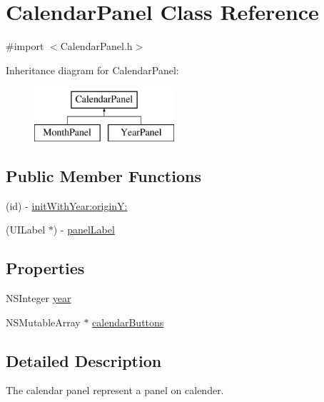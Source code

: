 \hypertarget{interface_calendar_panel}{\section{\-Calendar\-Panel \-Class \-Reference}
\label{interface_calendar_panel}
}


{\ttfamily \#import $<$\-Calendar\-Panel.\-h$>$}

\-Inheritance diagram for \-Calendar\-Panel\-:\begin{figure}[H]
\begin{center}
\leavevmode
\includegraphics[height=2.000000cm]{interface_calendar_panel}
\end{center}
\end{figure}
\subsection*{\-Public \-Member \-Functions}
\begin{DoxyCompactItemize}
\item 
(id) -\/ \hyperlink{interface_calendar_panel_ab7e592617ce2f2f04bb5425c72a73a0f}{init\-With\-Year\-:origin\-Y\-:}
\item 
(\-U\-I\-Label $\ast$) -\/ \hyperlink{interface_calendar_panel_a54b63df2da3bcf3f1bf7759bb641ef9b}{panel\-Label}
\end{DoxyCompactItemize}
\subsection*{\-Properties}
\begin{DoxyCompactItemize}
\item 
\-N\-S\-Integer \hyperlink{interface_calendar_panel_a295b0edcda13b30bc67c263a39dbb58a}{year}
\item 
\-N\-S\-Mutable\-Array $\ast$ \hyperlink{interface_calendar_panel_a16ee2521285d33fe0fb8e01bc4158af0}{calendar\-Buttons}
\end{DoxyCompactItemize}


\subsection{\-Detailed \-Description}
\-The calendar panel represent a panel on calender. 

